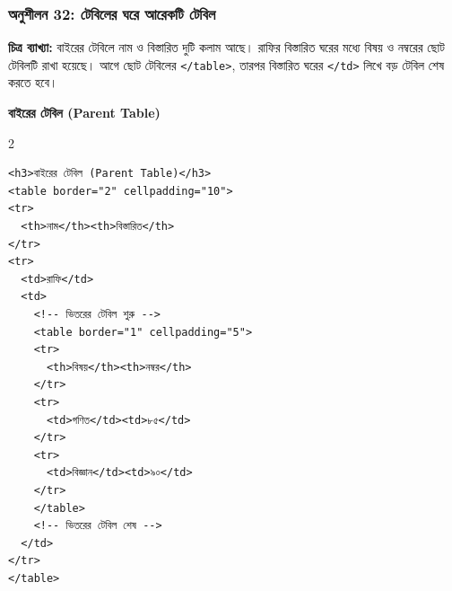 \par\noindent\subsubsection{অনুশীলন 32: টেবিলের ঘরে আরেকটি টেবিল}%
\noindent
\textbf{চিত্র ব্যাখ্যা:} বাইরের টেবিলে নাম ও বিস্তারিত দুটি কলাম আছে। রাফির বিস্তারিত ঘরের মধ্যে বিষয় ও নম্বরের ছোট টেবিলটি রাখা হয়েছে। আগে ছোট টেবিলের \texttt{</table>}, তারপর বিস্তারিত ঘরের \texttt{</td>} লিখে বড় টেবিল শেষ করতে হবে।





\par\smallskip
\noindent\begin{minipage}[t]{\linewidth}\vspace{0pt}
\begingroup\centering
\textbf{বাইরের টেবিল (Parent Table)}\par\smallskip
{}
\par\endgroup
\end{minipage}
\par\smallskip
{}
\par{}\par\smallskip
\begin{chFourBanglaCode}
\begin{multicols}{2}
\begin{verbatim}
<h3>বাইরের টেবিল (Parent Table)</h3>
<table border="2" cellpadding="10">
<tr>
  <th>নাম</th><th>বিস্তারিত</th>
</tr>
<tr>
  <td>রাফি</td>
  <td>
    <!-- ভিতরের টেবিল শুরু -->
    <table border="1" cellpadding="5">
    <tr>
      <th>বিষয়</th><th>নম্বর</th>
    </tr>
    <tr>
      <td>গণিত</td><td>৮৫</td>
    </tr>
    <tr>
      <td>বিজ্ঞান</td><td>৯০</td>
    </tr>
    </table>
    <!-- ভিতরের টেবিল শেষ -->
  </td>
</tr>
</table>
\end{verbatim}
\end{multicols}
\end{chFourBanglaCode}
\smallskip



